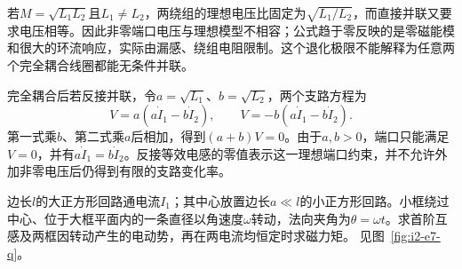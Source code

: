 \begin{solution}
若$M=\sqrt{L_1L_2}$且$L_1\ne L_2$，两绕组的理想电压比固定为$\sqrt{L_1/L_2}$，而直接并联又要求电压相等。因此非零端口电压与理想模型不相容；公式趋于零反映的是零磁能模和很大的环流响应，实际由漏感、绕组电阻限制。这个退化极限不能解释为任意两个完全耦合线圈都能无条件并联。

完全耦合后若反接并联，令$a=\sqrt{L_1}$、$b=\sqrt{L_2}$，两个支路方程为
\[V=a(a\dot I_1-b\dot I_2),\qquad V=-b(a\dot I_1-b\dot I_2).\]
第一式乘$b$、第二式乘$a$后相加，得到$(a+b)V=0$。由于$a,b>0$，端口只能满足$V=0$，并有$a\dot I_1=b\dot I_2$。反接等效电感的零值表示这一理想端口约束，并不允许外加非零电压后仍得到有限的支路变化率。
\end{solution}

\begin{example}[中心小方框旋转产生的双向感应]\label{ex:i2-e7}
边长$l$的大正方形回路通电流$I_1$；其中心放置边长$a\ll l$的小正方形回路。小框绕过中心、位于大框平面内的一条直径以角速度$\omega$转动，法向夹角为$\theta=\omega t$。求首阶互感及两框因转动产生的电动势，再在两电流均恒定时求磁力矩。 见图~\ref{fig:i2-e7-q}。
\end{example}

